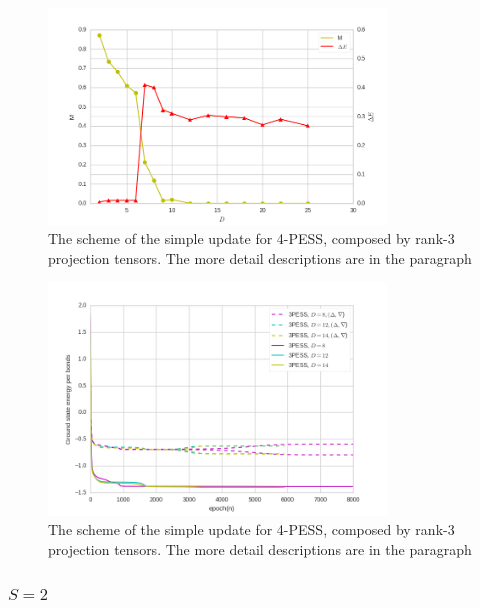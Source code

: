 \begin{figure}[ht]
	\centering
	\includegraphics[width=0.80\textwidth]{figures/3pess_MDE.png}
	\caption[The scheme of the simple update for 4-PESS, composed by rank-3 projection tensors.]{The scheme of the simple update for 4-PESS, composed by rank-3 projection tensors. The more detail descriptions are in the paragraph}
	\label{fig4328}
\end{figure}

\begin{figure}[ht]
	\centering
	\includegraphics[width=0.80\textwidth]{figures/3pess_GEN.png}
	\caption[The scheme of the simple update for 4-PESS, composed by rank-3 projection tensors.]{The scheme of the simple update for 4-PESS, composed by rank-3 projection tensors. The more detail descriptions are in the paragraph}
	\label{fig4329}
\end{figure}

\subsubsection{$S=2$}

